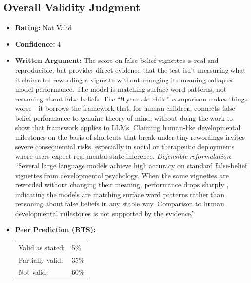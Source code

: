 \subsection{Overall Validity Judgment}
\begin{itemize}
    \item \textbf{Rating:} Not Valid
    \item \textbf{Confidence:} 4
    \item \textbf{Written Argument:} The score on false-belief vignettes is real and reproducible, but \citet{ullman2023llm} provides direct evidence that the test isn't measuring what it claims to: rewording a vignette without changing its meaning collapses model performance. The model is matching surface word patterns, not reasoning about false beliefs. The ``9-year-old child'' comparison makes things worse---it borrows the framework that, for human children, connects false-belief performance to genuine theory of mind, without doing the work to show that framework applies to LLMs. Claiming human-like developmental milestones on the basis of shortcuts that break under tiny rewordings invites severe consequential risks, especially in social or therapeutic deployments where users expect real mental-state inference. \emph{Defensible reformulation}: ``Several large language models achieve high accuracy on standard false-belief vignettes from developmental psychology. When the same vignettes are reworded without changing their meaning, performance drops sharply \citep{ullman2023llm}, indicating the models are matching surface word patterns rather than reasoning about false beliefs in any stable way. Comparison to human developmental milestones is not supported by the evidence.''
    \item \textbf{Peer Prediction (BTS):}

    \begin{tabular}{ll}
        Valid as stated: & 5\% \\
        Partially valid: & 35\% \\
        Not valid: & 60\% \\
        \end{tabular}\\[4pt]
\end{itemize}
